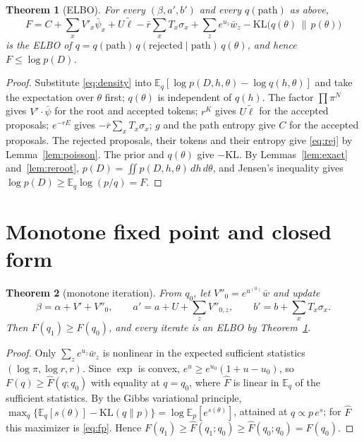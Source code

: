 \documentclass[11pt]{article}
\newtheorem{theorem}{Theorem}
\newcommand{\E}{\mathbb E}
\newcommand{\KL}{\mathrm{KL}}
\begin{document}
\begin{theorem}[ELBO]\label{thm:elbo}
For every $(\beta,a',b')$ and every $q(\text{path})$ as above,
\begin{equation}\label{eq:F}
F=C+\sum_xV'_x\bar\psi_x+U\tilde\ell-\bar r\sum_xT_x\sigma_x
 +\sum_ze^{u_z}\bar w_z-\KL\big(q(\theta)\,\|\,p(\theta)\big)
\end{equation}
is the ELBO of
$q=q(\text{path})\,q(\text{rejected}\mid\text{path})\,q(\theta)$, and hence
$F\le\log p(D)$.
\end{theorem}
\begin{proof}
Substitute \eqref{eq:density} into
$\E_q[\log p(D,h,\theta)-\log q(h,\theta)]$ and take the expectation over
$\theta$ first; $q(\theta)$ is independent of $q(h)$.
The factor $\prod\pi^N$ gives $V'\cdot\bar\psi$ for the root and accepted
tokens; $r^K$ gives $U\tilde\ell$ for the accepted proposals; $e^{-rE}$ gives
$-\bar r\sum_xT_x\sigma_x$; $g$ and the path entropy give $C$ for the accepted
proposals. The rejected proposals, their tokens and their entropy give
\eqref{eq:rej} by Lemma~\ref{lem:poisson}. The prior and $q(\theta)$ give
$-\KL$. By Lemmas~\ref{lem:exact} and~\ref{lem:reroot},
$p(D)=\iint p(D,h,\theta)\,dh\,d\theta$, and Jensen's inequality gives
$\log p(D)\ge\E_q\log(p/q)=F$.
\end{proof}

\section{Monotone fixed point and closed form}

\begin{theorem}[monotone iteration]\label{thm:mm}
From $q_0$, let $V''_0=e^{u^{(0)}}\bar w$ and update
\begin{equation}\label{eq:fp}
\beta=\alpha+V'+V''_0,\qquad a'=a+U+\textstyle\sum_zV''_{0,z},
\qquad b'=b+\sum_xT_x\sigma_x.
\end{equation}
Then $F(q_1)\ge F(q_0)$, and every iterate is an ELBO by
Theorem~\ref{thm:elbo}.
\end{theorem}
\begin{proof}
Only $\sum_ze^{u_z}\bar w_z$ is nonlinear in the expected sufficient statistics
$(\log\pi,\log r,r)$. Since $\exp$ is convex,
$e^{u}\ge e^{u_0}(1+u-u_0)$, so $F(q)\ge\hat F(q;q_0)$ with equality at
$q=q_0$, where $\hat F$ is linear in $\E_q$ of the sufficient statistics. By the
Gibbs variational principle,
$\max_q\{\E_q[s(\theta)]-\KL(q\|p)\}=\log\E_p[e^{s(\theta)}]$, attained at
$q\propto p\,e^{s}$; for $\hat F$ this maximizer is \eqref{eq:fp}. Hence
$F(q_1)\ge\hat F(q_1;q_0)\ge\hat F(q_0;q_0)=F(q_0)$.
\end{proof}
\end{document}
